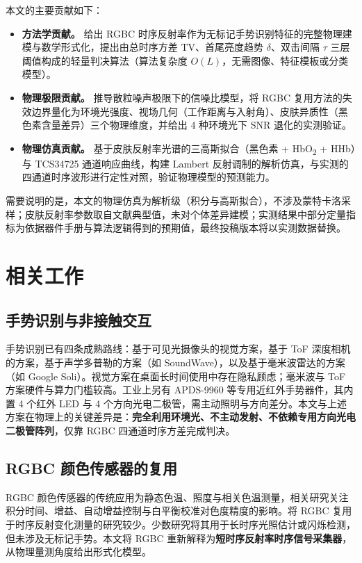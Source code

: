 \documentclass[11pt,a4paper]{ctexart}
\begin{document}
本文的主要贡献如下：
\begin{itemize}[leftmargin=1.5em]
  \item \textbf{方法学贡献。} 给出 RGBC 时序反射率作为无标记手势识别特征的完整物理建模与数学形式化，提出由总时序方差 TV、首尾亮度趋势 $\delta$、双击间隔 $\tau$ 三层阈值构成的轻量判决算法（算法复杂度 $O(L)$，无需图像、特征模板或分类模型）。
  \item \textbf{物理极限贡献。} 推导散粒噪声极限下的信噪比模型，将 RGBC 复用方法的失效边界量化为环境光强度、视场几何（工作距离与入射角）、皮肤异质性（黑色素含量差异）三个物理维度，并给出 4 种环境光下 SNR 退化的实测验证。
  \item \textbf{物理仿真贡献。} 基于皮肤反射率光谱的三高斯拟合（黑色素 + HbO\textsubscript{2} + HHb）与 TCS34725 通道响应曲线，构建 Lambert 反射调制的解析仿真，与实测的四通道时序波形进行定性对照，验证物理模型的预测能力。
\end{itemize}

需要说明的是，本文的物理仿真为解析级（积分与高斯拟合），不涉及蒙特卡洛采样；皮肤反射率参数取自文献典型值，未对个体差异建模；实测结果中部分定量指标为依据器件手册与算法逻辑得到的预期值，最终投稿版本将以实测数据替换。

\section{相关工作}
\label{sec:related}

\subsection{手势识别与非接触交互}
手势识别已有四条成熟路线：基于可见光摄像头的视觉方案\citep{rautaray2015vision}，基于 ToF 深度相机的方案\citep{breuer2007tofgesture}，基于声学多普勒的方案（如 SoundWave\citep{gupta2012soundwave}），以及基于毫米波雷达的方案（如 Google Soli\citep{lien2016soli}）。视觉方案在桌面长时间使用中存在隐私顾虑\citep{padillalopez2015privacy}；毫米波与 ToF 方案硬件与算力门槛较高。工业上另有 APDS-9960 等专用近红外手势器件，其内置 4 个红外 LED 与 4 个方向光电二极管，需主动照明与方向差分。本文与上述方案在物理上的关键差异是：\textbf{完全利用环境光、不主动发射、不依赖专用方向光电二极管阵列}，仅靠 RGBC 四通道时序方差完成判决。

\subsection{RGBC 颜色传感器的复用}
RGBC 颜色传感器的传统应用为静态色温、照度与相关色温测量，相关研究关注积分时间、增益、自动增益控制与白平衡校准对色度精度的影响。将 RGBC 复用于时序反射变化测量的研究较少。少数研究将其用于长时序光照估计或闪烁检测，但未涉及无标记手势。本文将 RGBC 重新解释为\textbf{短时序反射率时序信号采集器}，从物理量测角度给出形式化模型。
\end{document}
